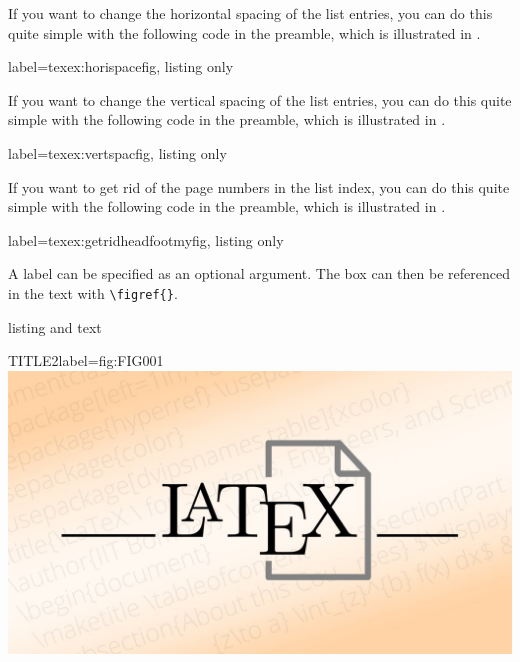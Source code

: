 \documentclass[]{myHOWTO-V001}
\begin{document}
If you want to change the horizontal spacing of the list entries, you can do this quite simple with the following code in the preamble, which is illustrated in .

\begin{myTEXEXdoclst}{}{label={texex:horispacefig}, listing only}
\makeatletter
	\renewcommand{\l@myFIG}{\@dottedtocline{1}{0mm}{0mm}}
\makeatother
\end{myTEXEXdoclst}

If you want to change the vertical spacing of the list entries, you can do this quite simple with the following code in the preamble, which is illustrated in .

\begin{myTEXEXdoclst}{}{label={texex:vertspacfig}, listing only}
\makeatletter
\makeatother
\end{myTEXEXdoclst}

If you want to get rid of the page numbers in the list index, you can do this quite simple with the following code in the preamble, which is illustrated in .

\begin{myTEXEXdoclst}{}{label={texex:getridheadfootmyfig}, listing only}
\let\oldlistofmyFIG\listofmyFIG

\renewcommand\listofmyFIG
{
	\pagestyle{empty} %
	\oldlistofmyFIG %
	\clearpage %
	\pagestyle{plain} %
}
\end{myTEXEXdoclst}

A label can be specified as an optional argument. The box can then be referenced in the text with \Verb|\figref{}|.

\begin{myTEXEXdoclst}{}{listing and text}
\centering
\begin{myFIGlst}{TITLE2}{label={fig:FIG001}}
	\includegraphics[scale=0.15]{LaTeX.jpg}
\end{myFIGlst}
\end{myTEXEXdoclst}
\end{document}
